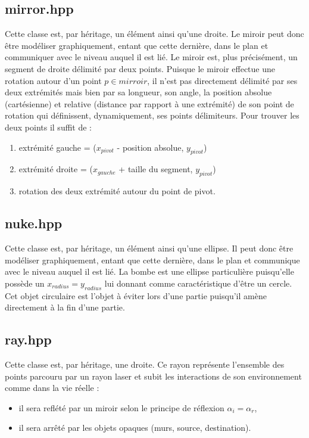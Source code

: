 \documentclass[a4paper,11pt]{report}
\begin{document}
\subsection[Miroir]{mirror.hpp}
Cette classe est, par héritage, un élément ainsi qu'une droite. Le miroir peut donc
être modéliser graphiquement, entant que cette dernière, dans le plan et
communiquer avec le niveau auquel il est lié. Le miroir est, plus précisément,
un segment de droite délimité par deux points. Puisque le miroir effectue une
rotation autour d'un point $p \in mirroir$, il n'est pas directement
délimité par ses deux extrémités mais bien par sa longueur, son angle, la position
absolue (cartésienne) et relative (distance par rapport à une extrémité)
de son point de rotation qui définissent, dynamiquement, ses points délimiteurs.
Pour trouver les deux points il suffit de :
\begin{enumerate}
	\item extrémité gauche = ($x_{pivot}$ - position absolue, $y_{pivot}$)
	\item extrémité droite = ($x_{gauche}$ + taille du segment, $y_{pivot}$)
	\item rotation des deux extrémité autour du point de pivot.
\end{enumerate}
\subsection[Bombe]{nuke.hpp}
Cette classe est, par héritage, un élément ainsi qu'une ellipse. Il peut donc
être modéliser graphiquement, entant que cette dernière, dans le plan et
communique avec le niveau auquel il est lié. La bombe est une ellipse
particulière puisqu'elle possède un $x_{radius} = y_{radius}$ lui donnant comme
caractéristique d'être un cercle. Cet objet circulaire est l'objet à éviter lors
d'une partie puisqu'il amène directement à la fin d'une partie.

\subsection[Rayon]{ray.hpp}
Cette classe est, par héritage, une droite. Ce rayon représente l'ensemble des
points parcouru par un rayon laser et subit les interactions de son
environnement comme dans la vie réelle :
\begin{itemize}
	\item il sera reflété par un miroir selon le principe de réflexion
		$\alpha_{i} = \alpha_{r}$,
	\item il sera arrêté par les objets opaques (murs, source, destination).
\end{itemize}
\end{document}
